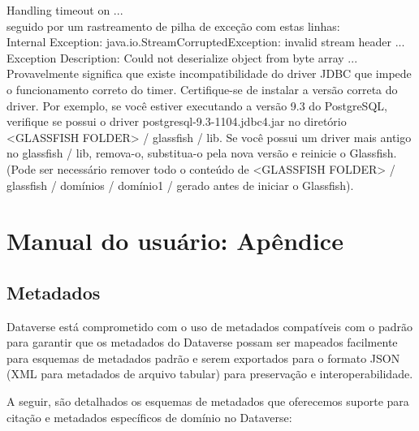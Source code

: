 \documentclass[12pt,hidelinks]{article}
\begin{document}
Handling timeout on ...\\

seguido por um rastreamento de pilha de exceção com estas linhas:\\

Internal Exception: java.io.StreamCorruptedException: invalid stream header ...\\

Exception Description: Could not deserialize object from byte array ...\\


Provavelmente significa que existe incompatibilidade do driver JDBC que impede o funcionamento correto do timer. Certifique-se de instalar a versão correta do driver. Por exemplo, se você estiver executando a versão 9.3 do PostgreSQL, verifique se possui o driver postgresql-9.3-1104.jdbc4.jar no diretório <GLASSFISH FOLDER> / glassfish / lib. Se você possui um driver mais antigo no glassfish / lib, remova-o, substitua-o pela nova versão e reinicie o Glassfish. (Pode ser necessário remover todo o conteúdo de <GLASSFISH FOLDER> / glassfish / domínios / domínio1 / gerado antes de iniciar o Glassfish).

     	
\section{Manual do usuário: Apêndice}
\vspace{10.5cm}

    \subsection{Metadados}
    
\qquad Dataverse está comprometido com o uso de metadados compatíveis com o padrão para garantir que os metadados do Dataverse possam ser mapeados facilmente para esquemas de metadados padrão e serem exportados para o formato JSON (XML para metadados de arquivo tabular) para preservação e interoperabilidade.

A seguir, são detalhados os esquemas de metadados que oferecemos suporte para citação e metadados específicos de domínio no Dataverse:
\end{document}
